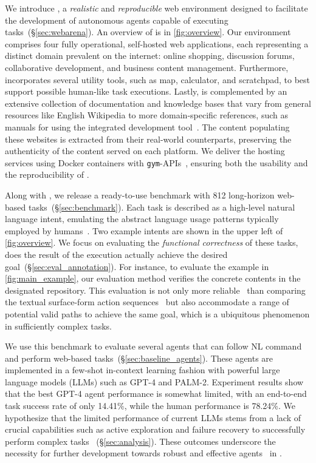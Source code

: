 We introduce \ours{}, a \emph{realistic} and \emph{reproducible} web environment designed to facilitate the development of autonomous agents capable of executing tasks~(\S\ref{sec:webarena}). An overview of \ours is in \autoref{fig:overview}.
Our environment comprises four fully operational, self-hosted web applications, each representing a distinct domain prevalent on the internet: online shopping, discussion forums, collaborative development, and business content management. %
Furthermore, \ours{} incorporates several utility tools, such as map, calculator, and scratchpad, to best support possible human-like task executions.
Lastly, \ours{} is complemented by an extensive collection of documentation and knowledge bases that vary from general resources like English Wikipedia to more domain-specific references, such as manuals for using the integrated development tool~\citep{fan2022minedojo}. 
The content populating these websites is extracted from their real-world counterparts, preserving the authenticity of the content served on each platform.
We deliver the hosting services using Docker containers with \texttt{gym}-APIs~\citep{1606.01540}, ensuring both the usability and the reproducibility of \ours.

Along with \ours, we release a ready-to-use benchmark with 812 long-horizon web-based tasks~(\S\ref{sec:benchmark}).
Each task is described as a high-level natural language intent, emulating the abstract language usage patterns typically employed by humans~\citep{bisk-etal-2019-benchmarking}. Two example intents are shown in the upper left of \autoref{fig:overview}.
We focus on evaluating the \emph{functional correctness} of these tasks, \ie does the result of the execution actually achieve the desired goal~(\S\ref{sec:eval_annotation}).
For instance, to evaluate the example in \autoref{fig:main_example}, our evaluation method verifies the concrete contents in the designated repository.
This evaluation is not only more reliable~\citep{zhong1709seq2sql,chen2021evaluating,wang2022execution} than comparing the textual surface-form action sequences~\citep{puig_virtualhome:_2018,deng2023mind2web} but also accommodate a range of potential valid paths to achieve the same goal, which is a ubiquitous phenomenon in sufficiently complex tasks.

We use this benchmark to evaluate several agents that can follow NL command and perform web-based tasks~(\S\ref{sec:baseline_agents}). 
These agents are implemented in a few-shot in-context learning fashion with powerful large language models (LLMs) such as \textsc{GPT-4} and \textsc{PALM-2}. 
Experiment results show that the best \textsc{GPT-4} agent performance is somewhat limited, with an end-to-end task success rate of only 14.41\%, while the human performance is 78.24\%.
We hypothesize that the limited performance of current LLMs stems from a lack of crucial capabilities such as active exploration and failure recovery to successfully perform complex tasks ~(\S\ref{sec:analysis}).
These outcomes underscore the necessity for further development towards robust and effective agents~\citep{lecun2022path} in \ours.

